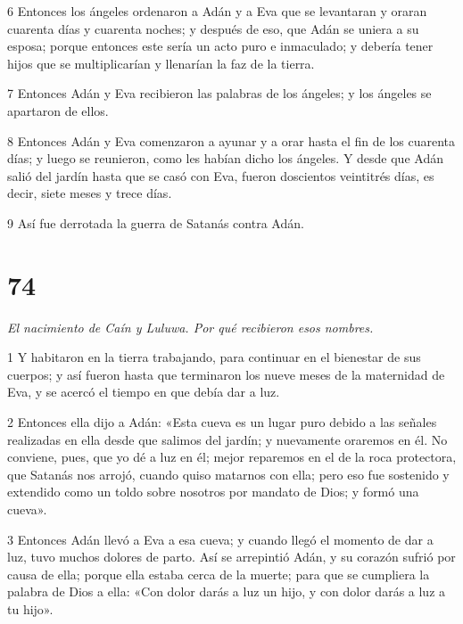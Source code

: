 \par 6 Entonces los ángeles ordenaron a Adán y a Eva que se levantaran y oraran cuarenta días y cuarenta noches; y después de eso, que Adán se uniera a su esposa; porque entonces este sería un acto puro e inmaculado; y debería tener hijos que se multiplicarían y llenarían la faz de la tierra.

\par 7 Entonces Adán y Eva recibieron las palabras de los ángeles; y los ángeles se apartaron de ellos.

\par 8 Entonces Adán y Eva comenzaron a ayunar y a orar hasta el fin de los cuarenta días; y luego se reunieron, como les habían dicho los ángeles. Y desde que Adán salió del jardín hasta que se casó con Eva, fueron doscientos veintitrés días, es decir, siete meses y trece días.

\par 9 Así fue derrotada la guerra de Satanás contra Adán.



\chapter{74}

\par \textit{El nacimiento de Caín y Luluwa. Por qué recibieron esos nombres.}

\par 1 Y habitaron en la tierra trabajando, para continuar en el bienestar de sus cuerpos; y así fueron hasta que terminaron los nueve meses de la maternidad de Eva, y se acercó el tiempo en que debía dar a luz.

\par 2 Entonces ella dijo a Adán: «Esta cueva es un lugar puro debido a las señales realizadas en ella desde que salimos del jardín; y nuevamente oraremos en él. No conviene, pues, que yo dé a luz en él; mejor reparemos en el de la roca protectora, que Satanás nos arrojó, cuando quiso matarnos con ella; pero eso fue sostenido y extendido como un toldo sobre nosotros por mandato de Dios; y formó una cueva».

\par 3 Entonces Adán llevó a Eva a esa cueva; y cuando llegó el momento de dar a luz, tuvo muchos dolores de parto. Así se arrepintió Adán, y su corazón sufrió por causa de ella; porque ella estaba cerca de la muerte; para que se cumpliera la palabra de Dios a ella: «Con dolor darás a luz un hijo, y con dolor darás a luz a tu hijo».

